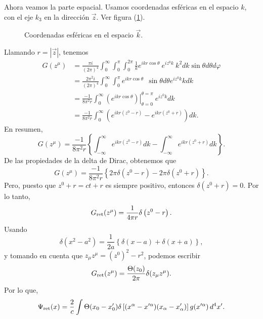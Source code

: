  Ahora veamos la parte espacial. Usamos coordenadas esféricas
 en el espacio $k$, con el eje $k_{3}$ en la dirección $\vec{z}$.
 Ver figura (\ref{R4}).
 \begin{figure}[h]
 \centerline{}
 \caption{Coordenadas esféricas en el espacio $\vec{k}$.}
 \label{R4}
 \end{figure}

 Llamando $r=\left\vert \vec{z}\right\vert $, tenemos%
 \begin{align*}
 G(z^\mu)    & =\frac{\pi i}{(2\pi)
 ^4}\int
 _{0}^{\infty}\int_{0}^{\pi}\int_{0}^{2\pi}\frac{1}{k}e^{ikr\cos\theta
 }~e^{iz^0k}~k^2dk\sin\theta d\theta d\varphi\\
 & =\frac{2\pi^2i}{(2\pi)
 ^4}\int_{0}^{\infty}\int_{0}^{\pi
 }e^{ikr\cos\theta}~~\sin\theta d\theta e^{iz^0k}kdk\\
 & =\frac{-1}{8\pi^2r}\int_{0}^{\infty}\left.  \left(
 e^{ikr\cos\theta
 }\right)  \right\vert _{\theta=0}^{\theta=\pi}~e^{iz^0k}dk\\
 & =\frac{-1}{8\pi^2r}\int_{0}^{\infty}\left(  e^{ikr\left(
 z^0-r\right) }-e^{ikr\left(  z^0+r\right)  }\right)  dk.
 \end{align*}
  En resumen,%
 \begin{equation}
 G(z^\mu)  =\frac{-1}{8\pi^2r}\left\{
 \int_{-\infty}^{\infty }e^{ikr\left(  z^0-r\right)
 }dk-\int_{-\infty}^{\infty}e^{ikr\left( z^0+r\right)
 }dk\right\}  .
 \end{equation}
 De las propiedades de la delta de Dirac, obtenemos que%
 \begin{equation}
 G(z^\mu)  =\frac{-1}{8\pi^2r}\left\{
 2\pi\delta\left( z^0-r\right)  -2\pi\delta\left(  z^0+r\right)
 \right\}  .
 \end{equation}
 Pero, puesto que $z^0+r=ct+r$ es siempre positivo, entonces
 $\delta\left(
 z^0+r\right)  =0$. Por lo tanto,%
 \begin{equation}
 G_{\rm ret}(z^\mu)  =\frac{1}{4\pi r}\delta\left(
 z^0-r\right)  .
 \end{equation}
 Usando
 \begin{equation}
 \delta\left(  x^2-a^2\right)  =\frac{1}{2a}\left\{
 \delta\left( x-a\right)  +\delta\left(  x+a\right)  \right\}  ,
 \end{equation}
 y  tomando en cuenta que $z_\mu z^\mu =(z^0)^2-r^2$, podemos escribir
 \begin{equation}
 G_{\rm ret}(z^\mu)  =\frac{\Theta(z_0)}{2\pi}\delta(z_\mu z^\mu) .
 \end{equation}
 Por lo que,%
 \begin{equation}
 \Psi_{\rm ret}(x)=\frac{2}{c}\int\Theta(x_0-x'_0)\delta\left[(x^{\alpha}-x^{\prime\alpha})  (x_{\alpha}-x_{\alpha }')\right] g(x^{\prime\alpha})\,d^4x'.\label{R-rela04}%
 \end{equation}
